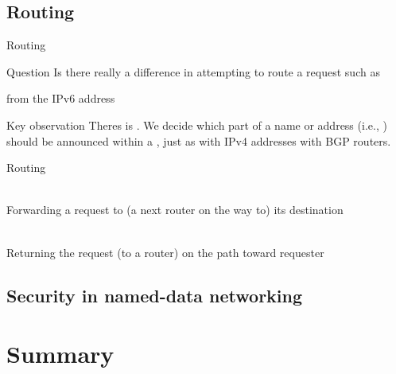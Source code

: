 \subsection{Routing}
\begin{slide}{Routing}
  \begin{alertblock}{Question}
    Is there really a difference in attempting to route a request such as
    \begin{quote}
    \end{quote}
    from the IPv6 address
    \begin{quote}
    \end{quote}
  \end{alertblock}
  \begin{alertblock}{Key observation}
    Theres is . We decide which part of a name or address (i.e., ) should be announced within a , just as with IPv4 addresses with
    BGP routers.
  \end{alertblock}
\end{slide}
\begin{slide}{Routing}
  \begin{centerfig}
     \\
    Forwarding a request to (a next router on the way to) its destination
  \end{centerfig}
  \begin{centerfig}
     \\
    Returning the request (to a router) on the path toward requester
  \end{centerfig}
\end{slide}
\subsection{Security in named-data networking}
\section{Summary}
